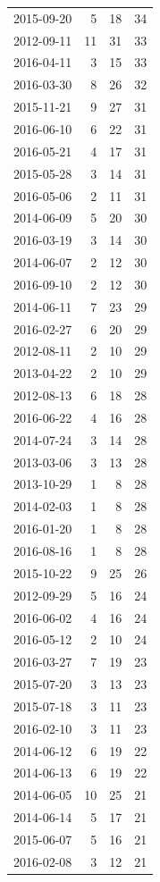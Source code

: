 \begin{tabular}{lrrr}
2015-09-20 & 5 & 18 & 34 \\
2012-09-11 & 11 & 31 & 33 \\
2016-04-11 & 3 & 15 & 33 \\
2016-03-30 & 8 & 26 & 32 \\
2015-11-21 & 9 & 27 & 31 \\
2016-06-10 & 6 & 22 & 31 \\
2016-05-21 & 4 & 17 & 31 \\
2015-05-28 & 3 & 14 & 31 \\
2016-05-06 & 2 & 11 & 31 \\
2014-06-09 & 5 & 20 & 30 \\
2016-03-19 & 3 & 14 & 30 \\
2014-06-07 & 2 & 12 & 30 \\
2016-09-10 & 2 & 12 & 30 \\
2014-06-11 & 7 & 23 & 29 \\
2016-02-27 & 6 & 20 & 29 \\
2012-08-11 & 2 & 10 & 29 \\
2013-04-22 & 2 & 10 & 29 \\
2012-08-13 & 6 & 18 & 28 \\
2016-06-22 & 4 & 16 & 28 \\
2014-07-24 & 3 & 14 & 28 \\
2013-03-06 & 3 & 13 & 28 \\
2013-10-29 & 1 & 8 & 28 \\
2014-02-03 & 1 & 8 & 28 \\
2016-01-20 & 1 & 8 & 28 \\
2016-08-16 & 1 & 8 & 28 \\
2015-10-22 & 9 & 25 & 26 \\
2012-09-29 & 5 & 16 & 24 \\
2016-06-02 & 4 & 16 & 24 \\
2016-05-12 & 2 & 10 & 24 \\
2016-03-27 & 7 & 19 & 23 \\
2015-07-20 & 3 & 13 & 23 \\
2015-07-18 & 3 & 11 & 23 \\
2016-02-10 & 3 & 11 & 23 \\
2014-06-12 & 6 & 19 & 22 \\
2014-06-13 & 6 & 19 & 22 \\
2014-06-05 & 10 & 25 & 21 \\
2014-06-14 & 5 & 17 & 21 \\
2015-06-07 & 5 & 16 & 21 \\
2016-02-08 & 3 & 12 & 21 \\

\end{tabular}
